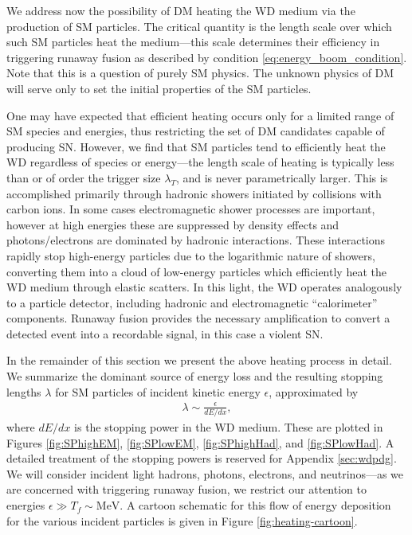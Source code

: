 We address now the possibility of DM heating the WD medium via the production of SM particles.
The critical quantity is the length scale over which such SM particles heat the medium---this scale determines their efficiency in triggering runaway fusion as described by condition \eqref{eq:energy_boom_condition}.
Note that this is a question of purely SM physics.
The unknown physics of DM will serve only to set the initial properties of the SM particles.

One may have expected that efficient heating occurs only for a limited range of SM species and energies, thus restricting the set of DM candidates capable of producing SN.
However, we find that SM particles tend to efficiently heat the WD regardless of species or energy---the length scale of heating is typically less than or of order the trigger size $\lambda_T$, and is never parametrically larger.
This is accomplished primarily through hadronic showers initiated by collisions with carbon ions.
In some cases electromagnetic shower processes are important, however at high energies these are suppressed by density effects and photons/electrons are dominated by hadronic interactions.
These interactions rapidly stop high-energy particles due to the logarithmic nature of showers, converting them into a cloud of low-energy particles which efficiently heat the WD medium through elastic scatters.
In this light, the WD operates analogously to a particle detector, including hadronic and electromagnetic ``calorimeter'' components.
Runaway fusion provides the necessary amplification to convert a detected event into a recordable signal, in this case a violent SN.

In the remainder of this section we present the above heating process in detail.
We summarize the dominant source of energy loss and the resulting stopping lengths $\lambda$ for SM particles of incident kinetic energy $\epsilon$, approximated by
\begin{align}
    \lambda \sim \frac{\epsilon}{dE/dx},
\end{align}
where $dE/dx$ is the stopping power in the WD medium.
These are plotted in Figures \ref{fig:SPhighEM}, \ref{fig:SPlowEM}, \ref{fig:SPhighHad}, and \ref{fig:SPlowHad}.
A detailed treatment of the stopping powers is reserved for Appendix \ref{sec:wdpdg}. 
We will consider incident light hadrons, photons, electrons, and neutrinos---as we are concerned with triggering runaway fusion, we restrict our attention to energies $\epsilon \gg T_f \sim \text{MeV}$.
A cartoon schematic for this flow of energy deposition for the various incident particles is given in Figure \ref{fig:heating-cartoon}.


